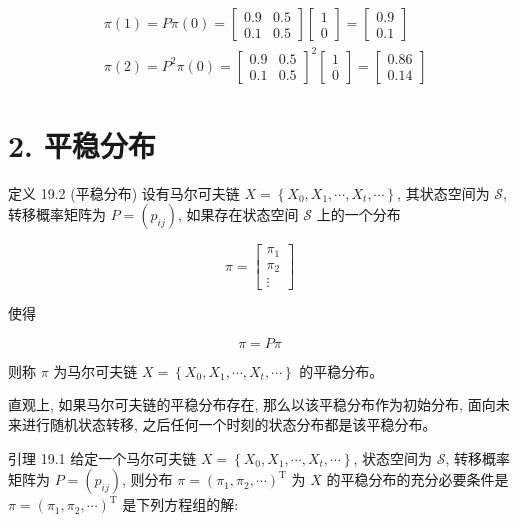 \documentclass[10pt]{article}
\begin{document}
\begin{CJK*}{UTF8}{bsmi}
$$
\begin{aligned}
& \pi(1)=P \pi(0)=\left[\begin{array}{ll}
0.9 & 0.5 \\
0.1 & 0.5
\end{array}\right]\left[\begin{array}{l}
1 \\
0
\end{array}\right]=\left[\begin{array}{l}
0.9 \\
0.1
\end{array}\right] \\
& \pi(2)=P^{2} \pi(0)=\left[\begin{array}{ll}
0.9 & 0.5 \\
0.1 & 0.5
\end{array}\right]^{2}\left[\begin{array}{l}
1 \\
0
\end{array}\right]=\left[\begin{array}{l}
0.86 \\
0.14
\end{array}\right]
\end{aligned}
$$

\section*{2. 平稳分布}
定义 19.2 (平稳分布) 设有马尔可夫链 $X=\left\{X_{0}, X_{1}, \cdots, X_{t}, \cdots\right\}$, 其状态空间为 $\mathcal{S}$,转移概率矩阵为 $P=\left(p_{i j}\right)$, 如果存在状态空间 $\mathcal{S}$ 上的一个分布

$$
\pi=\left[\begin{array}{c}
\pi_{1} \\
\pi_{2} \\
\vdots
\end{array}\right]
$$

使得


\begin{equation*}
\pi=P \pi \tag{19.15}
\end{equation*}


则称 $\pi$ 为马尔可夫链 $X=\left\{X_{0}, X_{1}, \cdots, X_{t}, \cdots\right\}$ 的平稳分布。

直观上, 如果马尔可夫链的平稳分布存在, 那么以该平稳分布作为初始分布, 面向未来进行随机状态转移, 之后任何一个时刻的状态分布都是该平稳分布。

引理 19.1 给定一个马尔可夫链 $X=\left\{X_{0}, X_{1}, \cdots, X_{t}, \cdots\right\}$, 状态空间为 $\mathcal{S}$, 转移概率矩阵为 $P=\left(p_{i j}\right)$, 则分布 $\pi=\left(\pi_{1}, \pi_{2}, \cdots\right)^{\mathrm{T}}$ 为 $X$ 的平稳分布的充分必要条件是 $\pi=\left(\pi_{1}, \pi_{2}, \cdots\right)^{\mathrm{T}}$ 是下列方程组的解:



\end{CJK*}
\end{document}
